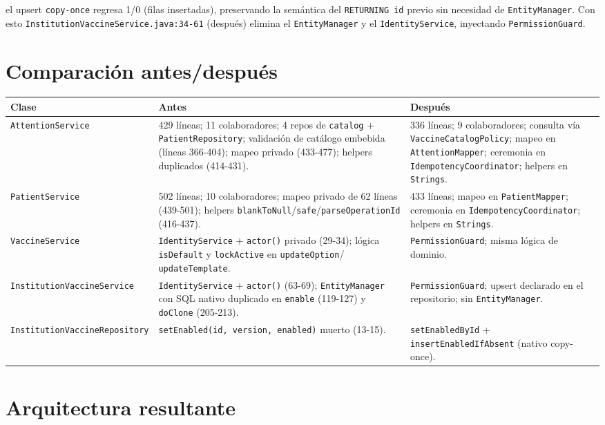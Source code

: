 \documentclass[11pt,a4paper]{article}
\begin{document}
el upsert \texttt{copy-once} regresa 1/0 (filas insertadas), preservando la
semántica del \texttt{RETURNING id} previo sin necesidad de
\texttt{EntityManager}. Con esto \texttt{InstitutionVaccineService.java:34-61}
(después) elimina el \texttt{EntityManager} y el \texttt{IdentityService},
inyectando \texttt{PermissionGuard}.

\section{Comparación antes/después}

\begin{longtable}{@{}p{4.6cm}p{5.2cm}p{5.2cm}@{}}
\toprule
\textbf{Clase} & \textbf{Antes} & \textbf{Después} \\
\midrule
\endhead
\texttt{AttentionService}
 & 429 líneas; 11 colaboradores; 4 repos de \texttt{catalog} +
   \texttt{PatientRepository}; validación de catálogo embebida (líneas
   366-404); mapeo privado (433-477); helpers duplicados (414-431).
 & 336 líneas; 9 colaboradores; consulta vía \texttt{VaccineCatalogPolicy};
   mapeo en \texttt{AttentionMapper}; ceremonia en
   \texttt{IdempotencyCoordinator}; helpers en \texttt{Strings}.
\\
\texttt{PatientService}
 & 502 líneas; 10 colaboradores; mapeo privado de 62 líneas (439-501);
   helpers \texttt{blankToNull}/\texttt{safe}/\texttt{parseOperationId}
   (416-437).
 & 433 líneas; mapeo en \texttt{PatientMapper}; ceremonia en
   \texttt{IdempotencyCoordinator}; helpers en \texttt{Strings}.
\\
\texttt{VaccineService}
 & \texttt{IdentityService} + \texttt{actor()} privado (29-34); lógica
   \texttt{isDefault} y \texttt{lockActive} en \texttt{updateOption}/
   \texttt{updateTemplate}.
 & \texttt{PermissionGuard}; misma lógica de dominio.
\\
\texttt{InstitutionVaccineService}
 & \texttt{IdentityService} + \texttt{actor()} (63-69); \texttt{EntityManager}
   con SQL nativo duplicado en \texttt{enable} (119-127) y \texttt{doClone}
   (205-213).
 & \texttt{PermissionGuard}; upsert declarado en el repositorio;
   sin \texttt{EntityManager}.
\\
\texttt{InstitutionVaccineRepository}
 & \texttt{setEnabled(id, version, enabled)} muerto (13-15).
 & \texttt{setEnabledById} + \texttt{insertEnabledIfAbsent} (nativo
   copy-once).
\\
\bottomrule
\end{longtable}

\section{Arquitectura resultante}
\end{document}
